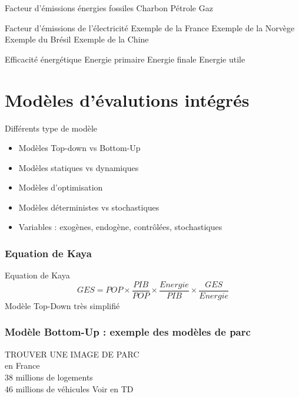 \documentclass{beamer}
\begin{document}
\begin{frame}{Facteur d'émissions énergies fossiles}
Charbon
Pétrole
Gaz
\end{frame}

\begin{frame}{Facteur d'émissions de l'électricité}
Exemple de la France
Exemple de la Norvège
Exemple du Brésil
Exemple de la Chine
\end{frame}

\begin{frame}{Efficacité énergétique}
Energie primaire
Energie finale
Energie utile
\end{frame}

\section{Modèles d'évalutions intégrés}

\begin{frame}{Différents type de modèle}
\begin{itemize}
 \item Modèles Top-down vs Bottom-Up
 \item Modèles statiques vs dynamiques
 \item Modèles d'optimisation
 \item Modèles déterministes vs stochastiques
 \item Variables : exogènes, endogène, contrôlées, stochastiques
\end{itemize}
\end{frame}



\begin{frame}
\frametitle{Equation de Kaya}
Equation de Kaya
\begin{equation*}
GES=POP \times \frac{PIB}{POP} \times \frac{Energie}{PIB}\times \frac{GES}{Energie}
\end{equation*}
\pause
Modèle Top-Down très simplifié
\end{frame}

\begin{frame}
\frametitle{Modèle Bottom-Up : exemple des modèles de parc}
TROUVER UNE IMAGE DE PARC\\
en France \\
38 millions de logements\\
46 millions de véhicules
Voir en TD
\end{frame}
\end{document}
